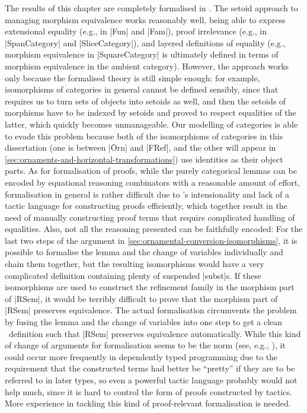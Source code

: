 The results of this chapter are completely formalised in \Agda.
The setoid approach to managing morphism equivalence works reasonably well, being able to express extensional equality (e.g., in |Fun| and |Fam|), proof irrelevance (e.g., in |SpanCategory| and |SliceCategory|), and layered definitions of equality (e.g., morphism equivalence in |SquareCategory| is ultimately defined in terms of morphism equivalence in the ambient category).
However, the approach works only because the formalised theory is still simple enough: for example, isomorphisms of categories in general cannot be defined sensibly, since that requires us to turn sets of objects into setoids as well, and then the setoids of morphisms have to be indexed by setoids and proved to respect equalities of the latter, which quickly becomes unmanageable.
Our modelling of categories is able to evade this problem because both of the isomorphisms of categories in this dissertation (one is between |Ōrn| and |FRef|, and the other will appear in \autoref{sec:ornaments-and-horizontal-transformations}) use identities as their object parts.
As for formalisation of proofs, while the purely categorical lemmas can be encoded by equational reasoning combinators with a reasonable amount of effort, formalisation in general is rather difficult due to \Agda's intensionality and lack of a tactic language for constructing proofs efficiently, which together result in the need of manually constructing proof terms that require complicated handling of equalities.
Also, not all the reasoning presented can be faithfully encoded: For the last two steps of the argument in \autoref{sec:ornamental-conversion-isomorphisms}, it is possible to formalise the lemma and the change of variables individually and chain them together, but the resulting isomorphisms would have a very complicated definition containing plenty of suspended |subst|s.
If these isomorphisms are used to construct the refinement family in the morphism part of |RSem|, it would be terribly difficult to prove that the morphism part of |RSem| preserves equivalence.
The actual formalisation circumvents the problem by fusing the lemma and the change of variables into one step to get a clean \Agda\ definition such that |RSem| preserves equivalence automatically.
While this kind of change of arguments for formalisation seems to be the norm (see, e.g., \citet[Section~4.5]{Avigad-prime-number-theorem}), it could occur more frequently in dependently typed programming due to the requirement that the constructed terms had better be ``pretty'' if they are to be referred to in later types, so even a powerful tactic language probably would not help much, since it is hard to control the form of proofs constructed by tactics.
More experience in tackling this kind of proof-relevant formalisation is needed.
